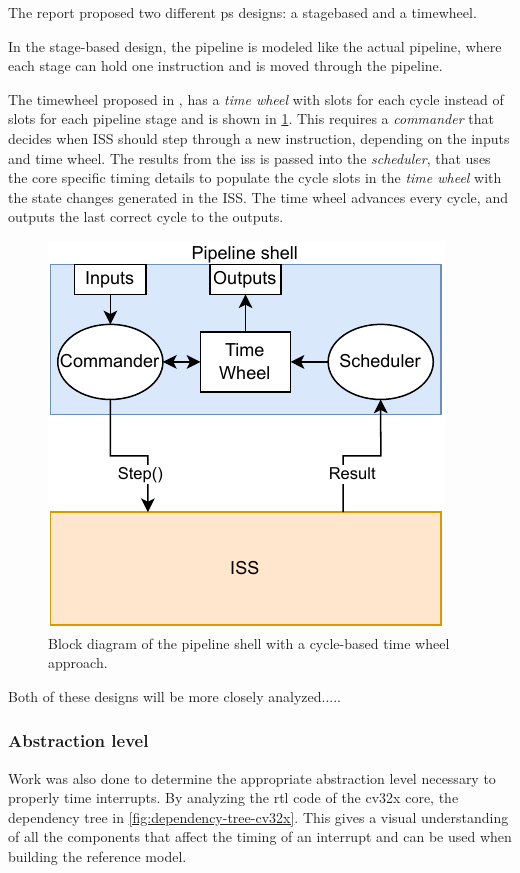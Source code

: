 The report proposed two different \gls{ps} designs: a \Gls{stagebased} and a \Gls{timewheel}. 

In the stage-based design, the pipeline is modeled like the actual pipeline, where each stage can hold one instruction and is moved through the pipeline.

The \Gls{timewheel} proposed in \cite{chiangEfficientTwolayeredCycleaccurate2009}, has a \textit{time wheel} with slots for each cycle instead of slots for each pipeline stage and is shown in \cref{fig:time wheel block}. This requires a \textit{commander} that decides when ISS should step through a new instruction, depending on the inputs and time wheel. The results from the \acrshort{iss} is passed into the \textit{scheduler}, that uses the core specific timing details to populate the cycle slots in the \textit{time wheel} with the state changes generated in the ISS. The time wheel advances every cycle, and outputs the last correct cycle to the outputs.

\begin{figure}[htb]
    \centering
    \includegraphics[width=0.5\linewidth]{prosjektoppgave/time-wheel.pdf}
    \caption{Block diagram of the pipeline shell with a cycle-based time wheel approach.}
    \label{fig:time wheel block}
\end{figure}


Both of these designs will be more closely analyzed.....

\subsubsection{Abstraction level}

Work was also done to determine the appropriate abstraction level necessary to properly time interrupts. By analyzing the \acrshort{rtl} code of the \gls{cv32x} core, the dependency tree in \cref{fig:dependency-tree-cv32x}. This gives a visual understanding of all the components that affect the timing of an interrupt and can be used when building the reference model.

